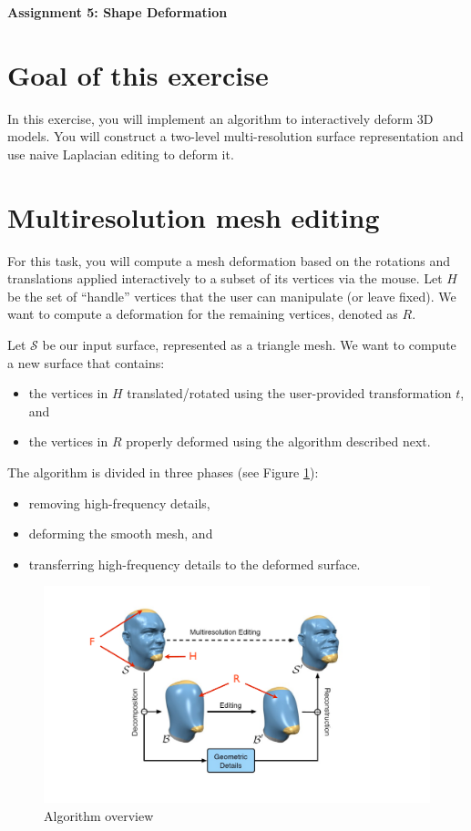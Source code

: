 \documentclass[11pt]{amsart}
\begin{document}
\hspace{50pt}

\begin{center}

{\huge \textbf{Assignment 5: Shape Deformation}}\\
\vspace{10pt}
\end{center}

\section*{Goal of this exercise}
In this exercise, you will implement an algorithm to interactively deform 3D models. You will construct a two-level multi-resolution surface representation and use naive Laplacian editing to deform it.

\section{Multiresolution mesh editing}
For this task, you will compute a mesh deformation based on the rotations and
translations applied interactively to a subset of its vertices via the mouse.
Let $H$ be the set of ``handle'' vertices that the user can manipulate (or
leave fixed). We want to compute a deformation for the remaining vertices,
denoted as $R$.

Let $\mathcal{S}$ be our input surface, represented as a triangle mesh. We want to compute a new surface that contains:
\begin{itemize}
\item the vertices in $H$ translated/rotated using the user-provided transformation $t$, and
\item the vertices in $R$ properly deformed using the algorithm described next.
\end{itemize}

The algorithm is divided in three phases (see Figure \ref{fig:schema}):

\begin{itemize}
\item removing high-frequency details,
\item deforming the smooth mesh, and
\item transferring high-frequency details to the deformed surface.
\end{itemize}

\begin{figure}[h!]
   \centering
   \includegraphics[width=0.7\linewidth]{schema}
   \caption{Algorithm overview}
   \label{fig:schema}
\end{figure}
\end{document}
